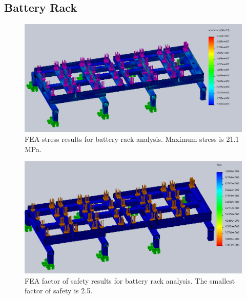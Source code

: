 \subsection{Battery Rack}\label{sec:br_fea}

\begin{figure}[H]
\centering
\includegraphics[width=\textwidth]{images/updated_battery_rack_VM}
\caption[Battery Rack FEA Stress Results]{FEA stress results for battery rack analysis. Maximum stress is 21.1 MPa.}
\label{fig:battery_rack_stress_fea}
\end{figure}

\begin{figure}[H]
\centering
\includegraphics[width=\textwidth]{images/updated_battery_rack_FOS}
\caption[Battery Rack FEA factor of safety Results]{FEA factor of safety results for battery rack analysis. The smallest factor of safety is 2.5.}
\label{fig:battery_rack_disp_fea}
\end{figure}


